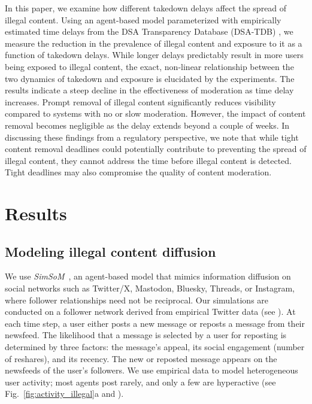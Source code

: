 \documentclass{article}
\newcommand{\simsom}{\emph{SimSoM}}
\begin{document}
In this paper, we examine how different takedown delays affect the spread of illegal content. Using an agent-based model parameterized with empirically estimated time delays from the DSA Transparency Database (DSA-TDB) \cite{dsadatabase}, 
we measure the reduction in the prevalence of illegal content and exposure to it as a function of takedown delays. While longer delays predictably result in more users being exposed to illegal content, the exact, non-linear relationship between the two dynamics of takedown and exposure is elucidated by the experiments. The results indicate a steep decline in the effectiveness of moderation as time delay increases. Prompt removal of illegal content significantly reduces visibility compared to systems with no or slow moderation. However, the impact of content removal becomes negligible as the delay extends beyond a couple of weeks.
%
In discussing these findings from a regulatory perspective, we note that while tight content removal deadlines could potentially contribute to preventing the spread of illegal content, they cannot address the time before illegal content is detected. Tight deadlines may also compromise the quality of content moderation. 

\section*{Results}

\subsection*{Modeling illegal content diffusion}

We use \simsom~\cite{truong2023quantifying}, an agent-based model that mimics information diffusion on social networks such as Twitter/X, Mastodon, Bluesky, Threads, or Instagram, where follower relationships need not be reciprocal. 
Our simulations are conducted on a follower network derived from empirical Twitter data (see ). 
At each time step, a user either posts a new message or reposts a message from their newsfeed. 
The likelihood that a message is selected by a user for reposting is determined by three factors: the message's appeal, its social engagement (number of reshares), and its recency. 
The new or reposted message appears on the newsfeeds of the user's followers. 
We use empirical data to model heterogeneous user activity; most agents post rarely, and only a few are hyperactive (see Fig.~\ref{fig:activity_illegal}a and ). 
\end{document}
